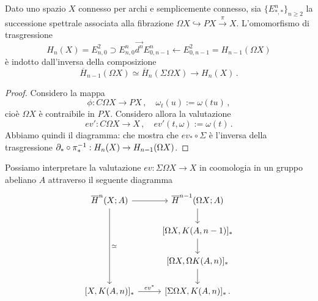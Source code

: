 \begin{prop}
	Dato uno spazio $X$ connesso per archi e semplicemente connesso,
	sia $\{E_{*,*}^{n}\}_{n \ge 2}$ la successione spettrale
	associata alla fibrazione $\Omega X \hookrightarrow PX \xrightarrow{\pi} X$.
	L'omomorfismo di trasgressione
	\begin{equation*}
		H_{n}(X) = E^{2}_{n,0} \supset E_{n,0}^{n}
		\overset{\longrightarrow}{d^{n}} E^{n}_{0,n-1} 
		\longleftarrow E_{0,n-1}^{2} = H_{n-1}(\Omega X)
	\end{equation*}
	è indotto dall'inversa della composizione
	\begin{equation*}
		\overline{H}_{n-1}(\Omega X) \simeq \overline{H}_{n}(\Sigma \Omega X)
		\longrightarrow H_{n}(X)\,.
	\end{equation*}
	\begin{proof}
		Considero la mappa
		\begin{equation*}
			\phi : C \Omega X \longrightarrow P X\,, \quad
			\omega_{t}(u) := \omega(tu)\,,
		\end{equation*}
		cioè $\Omega X$ è contraibile in $PX$.
		Considero allora la valutazione
		\begin{equation*}
			ev' : C \Omega X \longrightarrow X\,, \quad
			ev'(t, \omega) := \omega(t)\,.
		\end{equation*}
		Abbiamo quindi il diagramma:
		che mostra che $ev_{*} \circ \Sigma$ è l'inversa della trasgressione
		$\partial_{*} \circ \pi^{-1}_{*} : H_{n}(X) \to H_{n-1}(\Omega X)$.
	\end{proof}
\end{prop}

\begin{oss}
	Possiamo interpretare la valutazione $ev : \Sigma \Omega X \to X$ in 
	coomologia in un gruppo abeliano $A$ attraverso il seguente diagramma
	\begin{equation*}
		\begin{tikzcd}
			\overline{H}^{n}(X;A) \ar[r] \ar[ddd, "\simeq"]
			& \overline{H}^{n-1}(\Omega X; A) \ar[d] \\
			& {[\Omega X, K(A,n-1)]_{*}} \ar[d] \\
			& {[\Omega X, \Omega K(A,n)]_{*}} \ar[d] \\
			{[X, K(A,n)]_{*}} \ar[r, "ev^{*}"]
			& {[\Sigma \Omega X, K(A,n)]_{*}}\,.
		\end{tikzcd}
	\end{equation*}
\end{oss}

